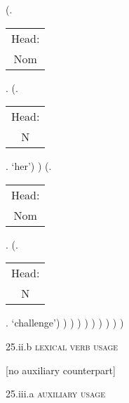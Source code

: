 \documentclass[12pt,letterpaper]{article}
\begin{document}
\begin{figure}
\begin{center}
\begin{parsetree}
			(.\begin{tabular}{c}Head:\\Nom\end{tabular}. 
			(.\begin{tabular}{c}Head:\\N\end{tabular}. `her')
			)
			(.\begin{tabular}{c}Head:\\Nom\end{tabular}. 
			(.\begin{tabular}{c}Head:\\N\end{tabular}. `challenge')
			)
			)
			)
			)
			)
			)
			)
			)
			)
			
		\end{parsetree}
		\hfill \break \hfill \break
		25.ii.b \textsc{lexical verb usage}
	\end{center}
\end{figure}

\clearpage


\begin{figure}
	\begin{center}
		[no auxiliary counterpart]
		
		\hfill \break \hfill \break
		25.iii.a \textsc{auxiliary usage}
	\end{center}
\end{figure}
\end{document}
